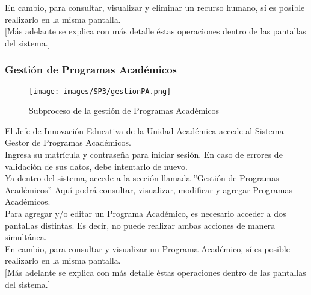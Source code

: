        En cambio, para consultar, visualizar y eliminar un recurso humano, sí es posible realizarlo en la misma pantalla.\\
        
        [Más adelante se explica con más detalle éstas operaciones dentro de las pantallas del sistema.]\\
        
        \subsubsection{Gestión de Programas Académicos}
        
        \begin{figure}[!hbtp]
        	\centering
        	\hypertarget{BPMNGPA}{\texttt{[image: images/SP3/gestionPA.png]}}
        	\caption{Subproceso de la gestión de Programas Académicos}
        	\label{BPMNGPA}
        \end{figure}
        
        El Jefe de Innovación Educativa de la Unidad Académica accede al Sistema Gestor de Programas Académicos.\\
        
        Ingresa su matrícula y contraseña para iniciar sesión. En caso de errores de validación de sus datos, debe intentarlo de nuevo.\\
        
        Ya dentro del sistema, accede a la sección llamada ''Gestión de Programas Académicos'' Aquí podrá consultar, visualizar, modificar y agregar Programas Académicos. \\
        
        Para agregar y/o editar un Programa Académico, es necesario acceder a dos pantallas distintas. Es decir, no puede realizar ambas acciones de manera simultánea.\\
        
        En cambio, para consultar y visualizar  un Programa Académico, sí es posible realizarlo en la misma pantalla.\\
        
        [Más adelante se explica con más detalle éstas operaciones dentro de las pantallas del sistema.]\\
        
        

